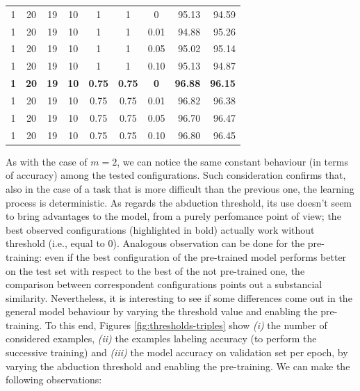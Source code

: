 \begin{table}[H]
\begin{tabular}{cccccccrr}
	1  			& 20     			& 19			& 10				& 1						& 1      				& 0      				& 95.13 				& 94.59\\ 
	1      		& 20     			& 19     		& 10     			& 1      				& 1      				& 0.01    				& 94.88    				& 95.26\\ 
	1      		& 20     			& 19     		& 10     			& 1      				& 1      				& 0.05    				& 95.02    				& 95.14\\
	1      		& 20     			& 19     		& 10     			& 1      				& 1      				& 0.10    				& 95.13    				& 94.87\\
	\textbf{1}  & \textbf{20}     	& \textbf{19}   & \textbf{10}     	& \textbf{0.75}      	& \textbf{0.75}      	& \textbf{0}	    	& \textbf{96.88}    	& \textbf{96.15}\\
	1      		& 20     			& 19     		& 10     			& 0.75      			& 0.75      			& 0.01    				& 96.82    				& 96.38\\
	1      		& 20     			& 19     		& 10     			& 0.75      			& 0.75      			& 0.05    				& 96.70    				& 96.47\\
	1      		& 20     			& 19     		& 10     			& 0.75      			& 0.75      			& 0.10    				& 96.80    				& 96.45\\
    \bottomrule
  \end{tabular}
\end{table}
As with the case of $m=2$, we can notice the same constant behaviour (in terms of accuracy) among the tested configurations. Such consideration confirms that, also in the case of a task that is more difficult than the previous one, the learning process is deterministic. As regards the abduction threshold, its use doesn't seem to bring advantages to the model, from a purely perfomance point of view; the best observed configurations (highlighted in bold) actually work without threshold (i.e., equal to 0). Analogous observation can be done for the pre-training: even if the best configuration of the pre-trained model performs better on the test set with respect to the best of the not pre-trained one, the comparison between correspondent configurations points out a substancial similarity. Nevertheless, it is interesting to see if some differences come out in the general model behaviour by varying the threshold value and enabling the pre-training. To this end, Figures \ref{fig:thresholds-triples} show \textit{(i)} the number of considered examples, \textit{(ii)} the examples labeling accuracy (to perform the successive training) and \textit{(iii)} the model accuracy on validation set per epoch, by varying the abduction threshold and enabling the pre-training. We can make the following observations:


